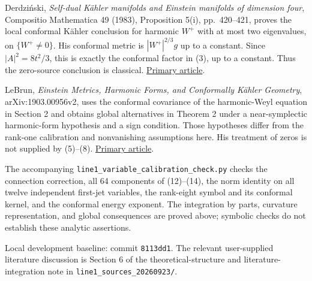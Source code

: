 \documentclass[
]{article}
\begin{document}
Derdziński, \emph{Self-dual Kähler manifolds and Einstein manifolds of
dimension four}, Compositio Mathematica 49 (1983), Proposition 5(i),
pp.~420--421, proves the local conformal Kähler conclusion for harmonic
\(W^+\) with at most two eigenvalues, on \(\{W^+\ne0\}\). His conformal
metric is \(|W^+|^{2/3}g\) up to a constant. Since \(|A|^2=8t^2/3\),
this is exactly the conformal factor in (3), up to a constant. Thus the
zero-source conclusion is classical.
\href{https://www.numdam.org/article/CM_1983__49_3_405_0.pdf}{Primary
article}.

LeBrun, \emph{Einstein Metrics, Harmonic Forms, and Conformally Kähler
Geometry}, arXiv:1903.00956v2, uses the conformal covariance of the
harmonic-Weyl equation in Section 2 and obtains global alternatives in
Theorem 2 under a near-symplectic harmonic-form hypothesis and a sign
condition. Those hypotheses differ from the rank-one calibration and
nonvanishing assumptions here. His treatment of zeros is not supplied by
(5)--(8). \href{https://arxiv.org/html/1903.00956}{Primary article}.

The accompanying \texttt{line1\_variable\_calibration\_check.py} checks
the connection correction, all 64 components of (12)--(14), the norm
identity on all twelve independent first-jet variables, the rank-eight
symbol and its conformal kernel, and the conformal energy exponent. The
integration by parts, curvature representation, and global consequences
are proved above; symbolic checks do not establish these analytic
assertions.

Local development baseline: commit \texttt{8113dd1}. The relevant
user-supplied literature discussion is Section 6 of the
theoretical-structure and literature-integration note in
\texttt{line1\_sources\_20260923/}.
\end{document}

